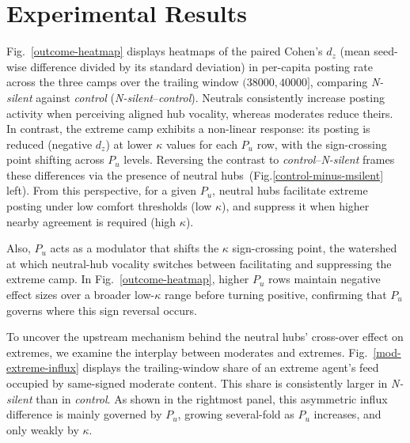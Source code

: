 \documentclass{svproc}
\def\VCR{\kappa}                 %
\begin{document}
\section{Experimental Results}\label{sec:results}
Fig.~\ref{outcome-heatmap} displays heatmaps of the paired Cohen's
$d_z$ (mean seed-wise difference divided by its standard deviation) in
per-capita posting rate across the three camps over the trailing
window $(38000, 40000]$, comparing \emph{N-silent} against
\emph{control} (\emph{N-silent}--\emph{control}). Neutrals
consistently increase posting activity when perceiving aligned hub
vocality, whereas moderates reduce theirs. In contrast, the
extreme camp exhibits a non-linear response: its posting is reduced
(negative $d_z$) at lower $\VCR$ values for each $P_u$ row, with the
sign-crossing point shifting across $P_u$ levels. Reversing the
contrast to \emph{control}--\emph{N-silent} frames these differences
via the presence of neutral hubs~(Fig.\ref{control-minus-msilent} left). From this perspective, for a given
$P_u$, neutral hubs facilitate extreme posting under low comfort
thresholds (low $\VCR$), and suppress it when higher nearby
agreement is required (high $\VCR$).
\par


Also, $P_u$ acts as a modulator that shifts the $\VCR$ sign-crossing
point, the watershed at which neutral-hub vocality switches between
facilitating and suppressing the extreme camp. In
Fig.~\ref{outcome-heatmap}, higher $P_u$ rows maintain negative effect
sizes over a broader low-$\VCR$ range before turning positive,
confirming that $P_u$ governs where this sign reversal occurs.
\par

To uncover the upstream mechanism behind the neutral hubs' cross-over
effect on extremes, we examine the interplay between moderates and
extremes. Fig.~\ref{mod-extreme-influx} displays the trailing-window share of
an extreme agent's feed occupied by same-signed moderate
content. This share is consistently larger in \emph{N-silent} than in
\emph{control}. As shown in the rightmost panel, this asymmetric
influx difference is mainly governed by $P_u$, growing several-fold as
$P_u$ increases, and only weakly by $\VCR$.
\par
\end{document}
